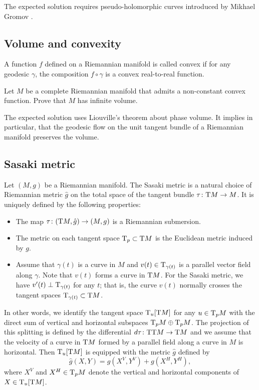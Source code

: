 The expected solution requires pseudo-holomorphic curves introduced by Mikhael Gromov \cite{gromov-pseudoholomorphic}.

\subsection*{Volume and convexity\thm}
\label{Volume and convexity} 

A function $f$ defined on a Riemannian manifold is called convex if for any geodesic $\gamma$, the composition $f\circ\gamma$ is a convex real-to-real function.

\begin{pr}
Let $M$ be a complete Riemannian manifold that admits a non-constant convex function. 
Prove that $M$ has infinite volume.
\end{pr}

The expected solution uses Liouville's theorem about phase volume.
It implies in particular, that the geodesic flow on the unit tangent bundle of a Riemannian manifold preserves the volume.


\subsection*{Sasaki metric}
\label{pr:Sasaki metric}

Let $(M,g)$ be a Riemannian manifold.
The Sasaki metric is a natural choice of Riemannian metric $\hat g$ on the total space of the tangent bundle $\tau\colon\mathrm{T} M\to M$.
It is uniquely defined by the following properties:
\begin{itemize}
\item The map $\tau\colon(\mathrm{T} M,\hat g)\to (M,g)$ is a Riemannian submersion.
\item The metric on each tangent space $\mathrm{T}_p\subset \mathrm{T} M$ is the Euclidean metric induced by $g$.
\item Assume that $\gamma(t)$ is a curve in $M$ and $v(t)\in\mathrm{T}_{\gamma(t)}$ is a parallel vector field along $\gamma$. 
Note that $v(t)$ forms a curve in $\mathrm{T} M$.
For the Sasaki metric, we have $v'(t)\perp \mathrm{T}_{\gamma(t)}$ for any $t$;
that is, the curve $v(t)$ normally crosses the tangent spaces $\mathrm{T}_{\gamma(t)}\subset \mathrm{T} M$.
\end{itemize}

In other words, we identify the tangent space 
$\mathrm{T}_u[\mathrm{T} M]$ for any $u\z\in \T_p M$ with the direct sum of vertical and horizontal subspaces $\T_p M\z\oplus \T_p M$.
The projection of this splitting is defined by the differential $d\tau\colon\mathrm{T}\mathrm{T} M\to \mathrm{T} M$
and we assume that the velocity of a curve in $\mathrm{T} M$ formed by a parallel field along a curve in $M$ is horizontal.
Then $\mathrm{T}_u[\mathrm{T} M]$ is equipped with the metric $\hat g$ defined by
\[\hat g(X,Y)=g(X^V,Y^V)+g(X^H,Y^H),\]
where $X^V$ and $X^H\in\mathrm{T}_pM$ denote the vertical and horizontal components of $X\in\mathrm{T}_u[\mathrm{T} M]$.



